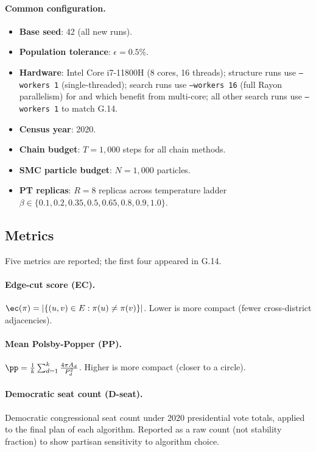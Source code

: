 \paragraph{Common configuration.}
\begin{itemize}
  \item \textbf{Base seed}: 42 (all new runs).
  \item \textbf{Population tolerance}: $\epsilon = 0.5\%$.
  \item \textbf{Hardware}: Intel Core i7-11800H (8 cores, 16 threads);
        structure runs use \texttt{--workers 1} (single-threaded);
        search runs use \texttt{--workers 16} (full Rayon parallelism)
        for \pt{} and \ams{} which benefit from multi-core; all other
        search runs use \texttt{--workers 1} to match G.14.
  \item \textbf{Census year}: 2020.
  \item \textbf{Chain budget}: $T = 1{,}000$ steps for all chain methods.
  \item \textbf{SMC particle budget}: $N = 1{,}000$ particles.
  \item \textbf{PT replicas}: $R = 8$ replicas across temperature ladder
        $\beta \in \{0.1, 0.2, 0.35, 0.5, 0.65, 0.8, 0.9, 1.0\}$.
\end{itemize}

\subsection{Metrics}

Five metrics are reported; the first four appeared in G.14.

\paragraph{Edge-cut score (EC).}
$\ec(\pi) = |\{(u,v) \in E : \pi(u) \neq \pi(v)\}|$.
Lower \ec{} is more compact (fewer cross-district adjacencies).

\paragraph{Mean Polsby-Popper (PP).}
$\pp = \frac{1}{k} \sum_{d=1}^k \frac{4\pi A_d}{P_d^2}$.
Higher \pp{} is more compact (closer to a circle).

\paragraph{Democratic seat count (D-seat).}
Democratic congressional seat count under 2020 presidential vote totals,
applied to the final plan of each algorithm.
Reported as a raw count (not stability fraction) to show partisan sensitivity
to algorithm choice.

